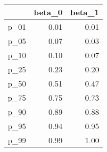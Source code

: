 \begin{table}[ht]
\centering
\begin{tabular}{rrr}
  \hline
 & beta\_0 & beta\_1 \\ 
  \hline
p\_01 & 0.01 & 0.01 \\ 
  p\_05 & 0.07 & 0.03 \\ 
  p\_10 & 0.10 & 0.07 \\ 
  p\_25 & 0.23 & 0.20 \\ 
  p\_50 & 0.51 & 0.47 \\ 
  p\_75 & 0.75 & 0.73 \\ 
  p\_90 & 0.89 & 0.88 \\ 
  p\_95 & 0.94 & 0.95 \\ 
  p\_99 & 0.99 & 1.00 \\ 
   \hline
\end{tabular}
\end{table}
